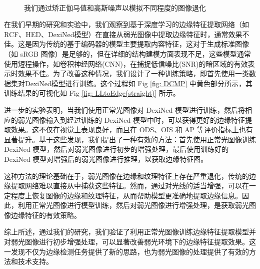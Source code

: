 \documentclass[a4paper]{ctexart}
\begin{document}
\begin{figure}[htbp]
\begin{subfigure}{0.08\textwidth}
				\label{fig：Gamma=0.4, Gauss Noise = 1.0}
			\end{subfigure} \\
			\caption{我们通过矫正伽马值和高斯噪声以模拟不同程度的图像退化}
			\label{fig: degraded}
		\end{figure}
		
		
		
		在我们早期的研究和实验中，我们观察到基于深度学习的边缘特征提取网络（如RCF、HED、DexiNed模型）在直接从弱光图像中提取边缘特征时，通常效果不佳。这是因为传统的基于编码器的模型主要提取内容特征，这对于生成标准图像（如 sRGB 图像）是足够的，但在详细的结构建模方面表现不足，这些模型通常使用短程操作，如卷积神经网络(CNN)，在捕捉低信噪比(SNR)的暗区域的有效表示时效果不佳。为了改善这种情况，我们设计了一种训练策略，即首先使用一类数据集对DexiNed模型进行训练。这个过程如 Fig \ref{fig: DCMP} 中黄色部分所示，其训练结果的可视化如 Fig \ref{fig: LLtoEdge(straight)} 所示。
		
		进一步的实验表明，当我们使用正常光图像对 DexiNed 模型进行训练，然后将相应的弱光图像输入到经过训练的 DexiNed 模型中时，可以获得更好的边缘特征提取效果。这不仅在视觉上表现良好，而且在 ODS、OIS 和 AP 等评价指标上也有显著提升。基于这些发现，我们提出了一种有效的方法：首先使用正常光图像训练 DexiNed 模型，然后对弱光图像进行初步的增强处理，最后使用训练好的 DexiNed 模型对增强后的弱光图像进行推理，以获取边缘特征图。
		
		这种方法的理论基础在于，弱光图像在边缘和纹理特征上存在严重退化，传统的边缘提取网络难以直接从中捕获这些特征。然而，通过对光线的适当增强，可以在一定程度上恢复图像的边缘和纹理特征，从而帮助模型更准确地提取边缘信息。因此，利用正常光图像进行模型训练，然后对弱光图像进行增强处理，是获取弱光图像边缘特征的有效策略。
		
		综上所述，通过我们的研究，我们验证了利用正常光图像训练边缘特征提取模型并对弱光图像进行初步增强处理，可以显著改善弱光环境下的边缘特征提取效果。这一发现不仅为边缘检测任务提供了新的思路，也为弱光图像的处理提供了有效的方法和技术支持。
		
\end{document}
